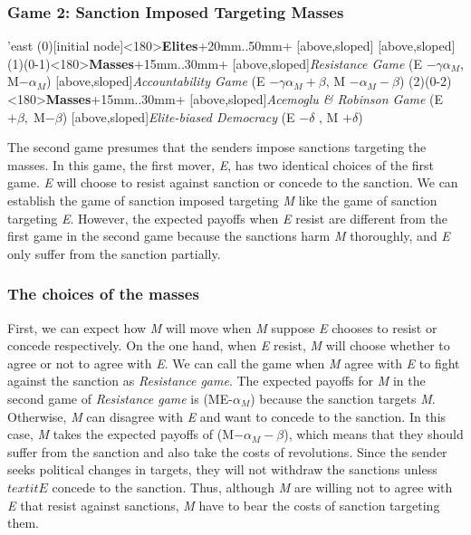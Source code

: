 \documentclass[11pt, letterpage, titlepage]{article}
\begin{document}
\subsubsection*{Game 2: Sanction Imposed Targeting Masses}
\begin{center}
\begin{istgame}[font=\footnotesize]
	\centering
	\setistgrowdirection'{east}
	\xtShowArrows
	\istroot(0)[initial node]<180>{\textbf{Elites}}+20mm..50mm+
	[above,sloped]  [above,sloped] \endist
	\istroot(1)(0-1)<180>{\textbf{Masses}}+15mm..30mm+
	[above,sloped]{\textit{Resistance Game} (E $- \gamma\alpha_{M}$, M$-\alpha_{M}$) }
	[above,sloped]{\textit{Accountability Game} (E $- \gamma\alpha_{M} + \beta$, M $- \alpha_{M} - \beta$)}  \endist
	\istroot(2)(0-2)<180>{\textbf{Masses}}+15mm..30mm+
	[above,sloped]{\textit{Acemoglu \& Robinson Game} (E $+ \beta,\; $M$-\beta$)}
	[above,sloped]{\textit{Elite-biased Democracy} (E $-\delta$ , M $+ \delta$)} \endist
\end{istgame}
\end{center}

The second game presumes that the senders impose sanctions targeting the masses. In this game, the first mover, \textit{E}, has two identical choices of the first game. \textit{E} will choose to resist against sanction or concede to the sanction. We can establish the game of sanction imposed targeting \textit{M} like the game of sanction targeting \textit{E}. However, the expected payoffs when \textit{E} resist are different from the first game in the second game because the sanctions harm \textit{M} thoroughly, and \textit{E} only suffer from the sanction partially.
		
\subsubsection*{The choices of the masses}
	
First, we can expect how \textit{M} will move when \textit{M} suppose \textit{E} chooses to resist or concede respectively. On the one hand, when \textit{E} resist, \textit{M} will choose whether to agree or not to agree with \textit{E}. We can call the game when \textit{M} agree with \textit{E} to fight against the sanction as \textit{Resistance game}. The expected payoffs for \textit{M} in the second game of \textit{Resistance game} is (ME-$\alpha_{M}$) because the sanction targets \textit{M}. Otherwise, \textit{M} can disagree with \textit{E} and want to concede to the sanction. In this case, \textit{M} takes the expected payoffs of (M$-\alpha_{M}-\beta$), which means that they should suffer from the sanction and also take the costs of revolutions. Since the sender seeks political changes in targets, they will not withdraw the sanctions unless $textit{E}$ concede to the sanction. Thus, although \textit{M} are willing not to agree with \textit{E} that resist against sanctions, \textit{M} have to bear the costs of sanction targeting them.
	
\end{document}
